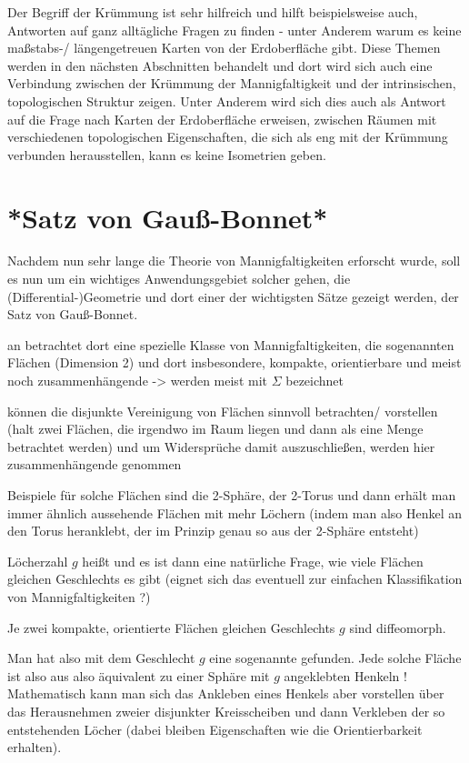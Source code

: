 Der Begriff der Krümmung ist sehr hilfreich und hilft beispielsweise auch, Antworten auf ganz alltägliche Fragen zu finden - unter Anderem warum es keine maßstabs-/ längengetreuen Karten von der Erdoberfläche gibt. Diese Themen werden in den nächsten Abschnitten behandelt und dort wird sich auch eine Verbindung zwischen der Krümmung der Mannigfaltigkeit und der intrinsischen, topologischen Struktur zeigen. Unter Anderem wird sich dies auch als Antwort auf die Frage nach Karten der Erdoberfläche erweisen, zwischen Räumen mit verschiedenen topologischen Eigenschaften, die sich als eng mit der Krümmung verbunden herausstellen, kann es keine Isometrien geben.


\newpage


	\section{*Satz von Gauß-Bonnet*}
Nachdem nun sehr lange die Theorie von Mannigfaltigkeiten erforscht wurde, soll es nun um ein wichtiges Anwendungsgebiet solcher gehen, die (Differential-)Geometrie und dort einer der wichtigsten Sätze gezeigt werden, der Satz von Gauß-Bonnet.


an betrachtet dort eine spezielle Klasse von Mannigfaltigkeiten, die sogenannten Flächen (Dimension 2) und dort insbesondere, kompakte, orientierbare und meist noch zusammenhängende -> werden meist mit $\Sigma$ bezeichnet

können die disjunkte Vereinigung von Flächen sinnvoll betrachten/ vorstellen (halt zwei Flächen, die irgendwo im Raum liegen und dann als eine Menge betrachtet werden) und um Widersprüche damit auszuschließen, werden hier zusammenhängende genommen

Beispiele für solche Flächen sind die 2-Sphäre, der 2-Torus und dann erhält man immer ähnlich aussehende Flächen mit mehr Löchern (indem man also Henkel an den Torus heranklebt, der im Prinzip genau so aus der 2-Sphäre entsteht)

Löcherzahl $g$ heißt  und es ist dann eine natürliche Frage, wie viele Flächen gleichen Geschlechts es gibt (eignet sich das eventuell zur einfachen Klassifikation von Mannigfaltigkeiten ?)

\begin{satz}
Je zwei kompakte, orientierte Flächen gleichen Geschlechts $g$ sind diffeomorph.
\end{satz}
Man hat also mit dem Geschlecht $g$ eine sogenannte  gefunden. Jede solche Fläche ist also aus also äquivalent zu einer Sphäre mit $g$ angeklebten Henkeln ! Mathematisch kann man sich das Ankleben eines Henkels aber vorstellen über das Herausnehmen zweier disjunkter Kreisscheiben und dann Verkleben der so entstehenden Löcher (dabei bleiben Eigenschaften wie die Orientierbarkeit erhalten).

